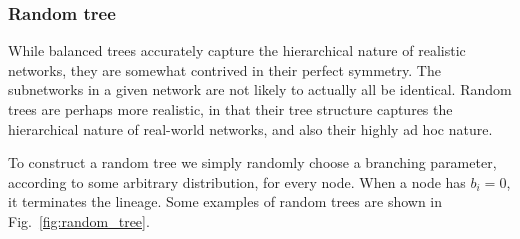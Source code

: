 %
%

\subsubsection{Random tree} 

While balanced trees accurately capture the hierarchical nature of realistic networks, they are somewhat contrived in their perfect symmetry. The subnetworks in a given network are not likely to actually all be identical. Random trees are perhaps more realistic, in that their tree structure captures the hierarchical nature of real-world networks, and also their highly ad hoc nature.

To construct a random tree we simply randomly choose a branching parameter, according to some arbitrary distribution, for every node. When a node has \mbox{$b_i=0$}, it terminates the lineage. Some examples of random trees are shown in Fig.~\ref{fig:random_tree}.

